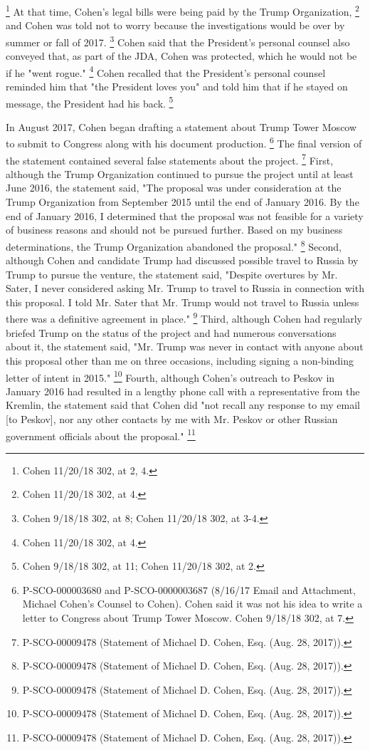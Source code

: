 \footnote{Cohen 11/20/18 302, at 2, 4.}
At that time, Cohen's legal bills were being paid by the Trump Organization,%
\footnote{Cohen 11/20/18 302, at 4.}
and Cohen was told not to worry because the investigations would be over by summer or fall of 2017.%
\footnote{Cohen 9/18/18 302, at 8;
Cohen 11/20/18 302, at 3-4.}
Cohen said that the President's personal counsel also conveyed that, as part of the JDA, Cohen was protected, which he would not be if he "went rogue."%
\footnote{Cohen 11/20/18 302, at 4.}
Cohen recalled that the President's personal counsel reminded him that "the President loves you" and told him that if he stayed on message, the President had his back.%
\footnote{Cohen 9/18/18 302, at 11;
Cohen 11/20/18 302, at 2.}

In August 2017, Cohen began drafting a statement about Trump Tower Moscow to submit to Congress along with his document production.%
\footnote{P-SCO-000003680 and P-SCO-0000003687 (8/16/17 Email and Attachment, Michael Cohen’s Counsel to Cohen).
Cohen said it was not his idea to write a letter to Congress about Trump Tower Moscow.
Cohen 9/18/18 302, at 7.}
The final version of the statement contained several false statements about the project.%
\footnote{P-SCO-00009478 (Statement of Michael D. Cohen, Esq. (Aug. 28, 2017)).}
First, although the Trump Organization continued to pursue the project until at least June 2016, the statement said, "The proposal was under consideration at the Trump Organization from September 2015 until the end of January 2016.
By the end of January 2016, I determined that the proposal was not feasible for a variety of business reasons and should not be pursued further.
Based on my business determinations, the Trump Organization abandoned the proposal."%
\footnote{P-SCO-00009478 (Statement of Michael D. Cohen, Esq. (Aug. 28, 2017)).}
Second, although Cohen and candidate Trump had discussed possible travel to Russia by Trump to pursue the venture, the statement said, "Despite overtures by Mr. Sater, I never considered asking Mr. Trump to travel to Russia in connection with this proposal.
I told Mr. Sater that Mr. Trump would not travel to Russia unless there was a definitive agreement in place."%
\footnote{P-SCO-00009478 (Statement of Michael D. Cohen, Esq. (Aug. 28, 2017)).}
Third, although Cohen had regularly briefed Trump on the status of the project and had numerous conversations about it, the statement said, "Mr. Trump was never in contact with anyone about this proposal other than me on three occasions, including signing a non-binding letter of intent in 2015."%
\footnote{P-SCO-00009478 (Statement of Michael D. Cohen, Esq. (Aug. 28, 2017)).}
Fourth, although Cohen's outreach to Peskov in January 2016 had resulted in a lengthy phone call with a representative from the Kremlin, the statement said that Cohen did "not recall any response to my email [to Peskov], nor any other contacts by me with Mr. Peskov or other Russian government officials about the proposal."%
\footnote{P-SCO-00009478 (Statement of Michael D. Cohen, Esq. (Aug. 28, 2017)).}

